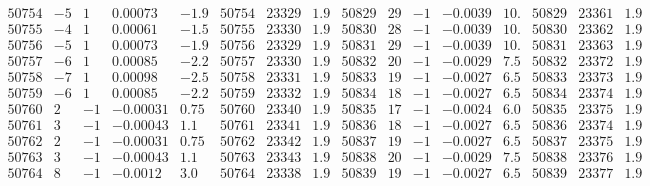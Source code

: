 \documentclass[11pt,reqno,a4letter]{article}
\numberwithin{figure}{section}
\numberwithin{table}{section}
\theoremstyle{plain}
\numberwithin{theorem}{section}
\theoremstyle{definition}
\begin{document}
\begin{table}[ht]
\begin{equation*}
{\begin{array}{ccccc|ccc||ccccc|ccc}
50754 & -5 & 1 & 0.00073 & -1.9 & 50754 & 23329 & 1.9 & 50829 & 29 & -1 & -0.0039 & 10. & 50829 & 23361 & 1.9  \\
50755 & -4 & 1 & 0.00061 & -1.5 & 50755 & 23330 & 1.9 & 50830 & 28 & -1 & -0.0039 & 10. & 50830 & 23362 & 1.9  \\
50756 & -5 & 1 & 0.00073 & -1.9 & 50756 & 23329 & 1.9 & 50831 & 29 & -1 & -0.0039 & 10. & 50831 & 23363 & 1.9  \\
50757 & -6 & 1 & 0.00085 & -2.2 & 50757 & 23330 & 1.9 & 50832 & 20 & -1 & -0.0029 & 7.5 & 50832 & 23372 & 1.9  \\
50758 & -7 & 1 & 0.00098 & -2.5 & 50758 & 23331 & 1.9 & 50833 & 19 & -1 & -0.0027 & 6.5 & 50833 & 23373 & 1.9  \\
50759 & -6 & 1 & 0.00085 & -2.2 & 50759 & 23332 & 1.9 & 50834 & 18 & -1 & -0.0027 & 6.5 & 50834 & 23374 & 1.9  \\
50760 & 2 & -1 & -0.00031 & 0.75 & 50760 & 23340 & 1.9 & 50835 & 17 & -1 & -0.0024 & 6.0 & 50835 & 23375 & 1.9  \\
50761 & 3 & -1 & -0.00043 & 1.1 & 50761 & 23341 & 1.9 & 50836 & 18 & -1 & -0.0027 & 6.5 & 50836 & 23374 & 1.9  \\
50762 & 2 & -1 & -0.00031 & 0.75 & 50762 & 23342 & 1.9 & 50837 & 19 & -1 & -0.0027 & 6.5 & 50837 & 23375 & 1.9  \\
50763 & 3 & -1 & -0.00043 & 1.1 & 50763 & 23343 & 1.9 & 50838 & 20 & -1 & -0.0029 & 7.5 & 50838 & 23376 & 1.9  \\
50764 & 8 & -1 & -0.0012 & 3.0 & 50764 & 23338 & 1.9 & 50839 & 19 & -1 & -0.0027 & 6.5 & 50839 & 23377 & 1.9  \\
\end{array} 
}
\end{equation*} 
\clearpage 

\end{table} 

\clearpage 
\end{document}
